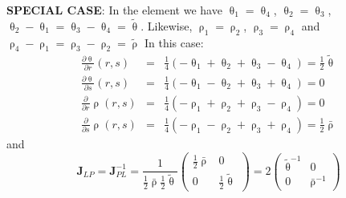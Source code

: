 {\bf SPECIAL CASE}: In the element we have $\uptheta_1=\uptheta_4$, $\uptheta_2=\uptheta_3$, $\uptheta_2-\uptheta_1=\uptheta_3-\uptheta_4=\tilde{\uptheta}$.
Likewise, $\uprho_1=\uprho_2$, $\uprho_3=\uprho_4$ and $\uprho_4-\uprho_1=\uprho_3-\uprho_2=\tilde{\uprho}$
In this case:
\begin{eqnarray}
\frac{\partial\uptheta}{\partial r}(r,s) 
&=& \frac14 (-\uptheta_1 + \uptheta_2 + \uptheta_3 - \uptheta_4) = \frac12 \tilde{\uptheta}\\
\frac{\partial\uptheta}{\partial s}(r,s) 
&=& \frac14 (-\uptheta_1 - \uptheta_2 + \uptheta_3 + \uptheta_4) =0\\
\frac{\partial}{\partial r}\uprho(r,s)   
&=& \frac14 (-\uprho_1 + \uprho_2 + \uprho_3 - \uprho_4) = 0\\
\frac{\partial}{\partial s}\uprho(r,s)   
&=& \frac14 (-\uprho_1 - \uprho_2 + \uprho_3 + \uprho_4) = \frac12 \bar{\uprho}
\end{eqnarray}
and
\begin{equation}
\boxed{
{\bm J}_{LP}={\bm J}_{PL}^{-1} 
= \frac{1}{\frac12 \bar{\uprho} \frac12 \tilde{\uptheta}} 
\left(
\begin{array}{cc}
\frac12 \bar{\uprho} & 0 \\
0 & \frac12 \tilde{\uptheta}
\end{array}
\right)
=2
\left(
\begin{array}{cc}
\tilde{\uptheta}^{-1} & 0 \\
0 &  \bar{\uprho}^{-1}
\end{array}
\right)}
\end{equation}



